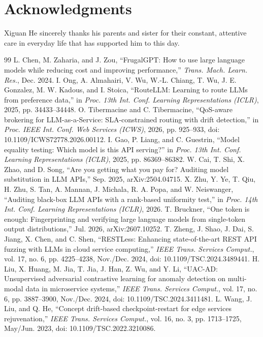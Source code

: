 \documentclass[10pt,journal,compsoc]{IEEEtran}
\begin{document}
\section*{Acknowledgments}
Xiguan He sincerely thanks his parents and sister for their constant, attentive care in everyday life that has supported him to this day.

\begin{thebibliography}{99}
 L. Chen, M. Zaharia, and J. Zou, ``FrugalGPT: How to use large language models while reducing cost and improving performance,'' \emph{Trans. Mach. Learn. Res.}, Dec. 2024.
 I. Ong, A. Almahairi, V. Wu, W.-L. Chiang, T. Wu, J. E. Gonzalez, M. W. Kadous, and I. Stoica, ``RouteLLM: Learning to route LLMs from preference data,'' in \emph{Proc. 13th Int. Conf. Learning Representations (ICLR)}, 2025, pp. 34433--34448.
 O. Tibermacine and C. Tibermacine, ``QoS-aware brokering for LLM-as-a-Service: SLA-constrained routing with drift detection,'' in \emph{Proc. IEEE Int. Conf. Web Services (ICWS)}, 2026, pp. 925--933, doi: 10.1109/ICWS72778.2026.00112.
 I. Gao, P. Liang, and C. Guestrin, ``Model equality testing: Which model is this API serving?'' in \emph{Proc. 13th Int. Conf. Learning Representations (ICLR)}, 2025, pp. 86369--86382.
 W. Cai, T. Shi, X. Zhao, and D. Song, ``Are you getting what you pay for? Auditing model substitution in LLM APIs,'' Sep. 2025, arXiv:2504.04715.
 X. Zhu, Y. Ye, T. Qiu, H. Zhu, S. Tan, A. Mannan, J. Michala, R. A. Popa, and W. Neiswanger, ``Auditing black-box LLM APIs with a rank-based uniformity test,'' in \emph{Proc. 14th Int. Conf. Learning Representations (ICLR)}, 2026.
 T. Bruckner, ``One token is enough: Fingerprinting and verifying large language models from single-token output distributions,'' Jul. 2026, arXiv:2607.10252.
 T. Zheng, J. Shao, J. Dai, S. Jiang, X. Chen, and C. Shen, ``RESTLess: Enhancing state-of-the-art REST API fuzzing with LLMs in cloud service computing,'' \emph{IEEE Trans. Services Comput.}, vol. 17, no. 6, pp. 4225--4238, Nov./Dec. 2024, doi: 10.1109/TSC.2024.3489441.
 H. Liu, X. Huang, M. Jia, T. Jia, J. Han, Z. Wu, and Y. Li, ``UAC-AD: Unsupervised adversarial contrastive learning for anomaly detection on multi-modal data in microservice systems,'' \emph{IEEE Trans. Services Comput.}, vol. 17, no. 6, pp. 3887--3900, Nov./Dec. 2024, doi: 10.1109/TSC.2024.3411481.
 L. Wang, J. Liu, and Q. He, ``Concept drift-based checkpoint-restart for edge services rejuvenation,'' \emph{IEEE Trans. Services Comput.}, vol. 16, no. 3, pp. 1713--1725, May/Jun. 2023, doi: 10.1109/TSC.2022.3210086.

\end{thebibliography}
\end{document}
